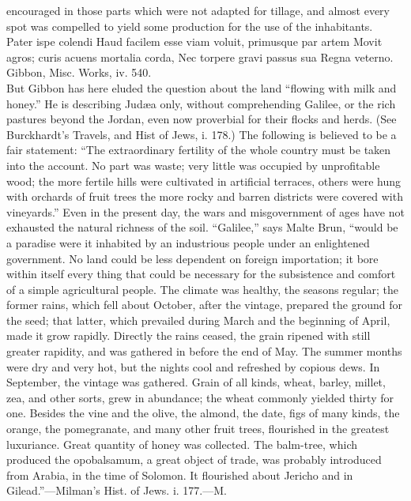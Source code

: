 {encouraged in those parts which were not adapted for tillage, and
almost every spot was compelled to yield some production for the
use of the inhabitants.\\
Pater ispe colendi Haud facilem esse viam voluit, primusque par
artem Movit agros; curis acuens mortalia corda, Nec torpere gravi
passus sua Regna veterno. Gibbon, Misc. Works, iv. 540.\\
But Gibbon has here eluded the question about the land “flowing
with milk and honey.” He is describing Judæa only, without
comprehending Galilee, or the rich pastures beyond the Jordan,
even now proverbial for their flocks and herds. (See Burckhardt’s
Travels, and Hist of Jews, i. 178.) The following is believed to
be a fair statement: “The extraordinary fertility of the whole
country must be taken into the account. No part was waste; very
little was occupied by unprofitable wood; the more fertile hills
were cultivated in artificial terraces, others were hung with
orchards of fruit trees the more rocky and barren districts were
covered with vineyards.” Even in the present day, the wars and
misgovernment of ages have not exhausted the natural richness of
the soil. “Galilee,” says Malte Brun, “would be a paradise were
it inhabited by an industrious people under an enlightened
government. No land could be less dependent on foreign
importation; it bore within itself every thing that could be
necessary for the subsistence and comfort of a simple
agricultural people. The climate was healthy, the seasons
regular; the former rains, which fell about October, after the
vintage, prepared the ground for the seed; that latter, which
prevailed during March and the beginning of April, made it grow
rapidly. Directly the rains ceased, the grain ripened with still
greater rapidity, and was gathered in before the end of May. The
summer months were dry and very hot, but the nights cool and
refreshed by copious dews. In September, the vintage was
gathered. Grain of all kinds, wheat, barley, millet, zea, and
other sorts, grew in abundance; the wheat commonly yielded thirty
for one. Besides the vine and the olive, the almond, the date,
figs of many kinds, the orange, the pomegranate, and many other
fruit trees, flourished in the greatest luxuriance. Great
quantity of honey was collected. The balm-tree, which produced
the opobalsamum, a great object of trade, was probably introduced
from Arabia, in the time of Solomon. It flourished about Jericho
and in Gilead.”—Milman’s Hist. of Jews. i. 177.—M.}


